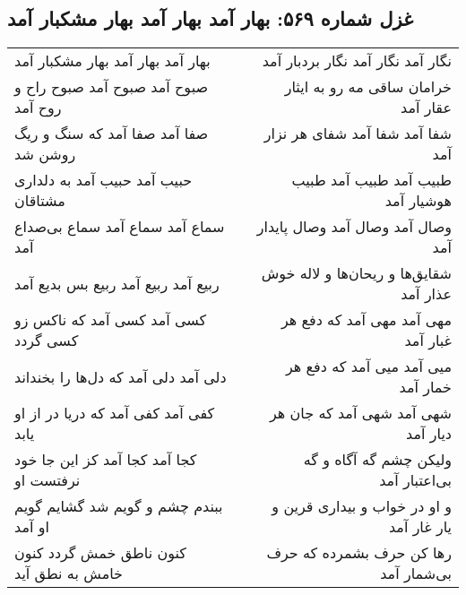 \begin{center}
\section*{غزل شماره ۵۶۹: بهار آمد بهار آمد بهار مشکبار آمد}
\label{sec:0569}
\begin{longtable}{l p{0.5cm} r}
بهار آمد بهار آمد بهار مشکبار آمد
&&
نگار آمد نگار آمد نگار بردبار آمد
\\
صبوح آمد صبوح آمد صبوح راح و روح آمد
&&
خرامان ساقی مه رو به ایثار عقار آمد
\\
صفا آمد صفا آمد که سنگ و ریگ روشن شد
&&
شفا آمد شفا آمد شفای هر نزار آمد
\\
حبیب آمد حبیب آمد به دلداری مشتاقان
&&
طبیب آمد طبیب آمد طبیب هوشیار آمد
\\
سماع آمد سماع آمد سماع بی‌صداع آمد
&&
وصال آمد وصال آمد وصال پایدار آمد
\\
ربیع آمد ربیع آمد ربیع بس بدیع آمد
&&
شقایق‌ها و ریحان‌ها و لاله خوش عذار آمد
\\
کسی آمد کسی آمد که ناکس زو کسی گردد
&&
مهی آمد مهی آمد که دفع هر غبار آمد
\\
دلی آمد دلی آمد که دل‌ها را بخنداند
&&
میی آمد میی آمد که دفع هر خمار آمد
\\
کفی آمد کفی آمد که دریا در از او یابد
&&
شهی آمد شهی آمد که جان هر دیار آمد
\\
کجا آمد کجا آمد کز این جا خود نرفتست او
&&
ولیکن چشم گه آگاه و گه بی‌اعتبار آمد
\\
ببندم چشم و گویم شد گشایم گویم او آمد
&&
و او در خواب و بیداری قرین و یار غار آمد
\\
کنون ناطق خمش گردد کنون خامش به نطق آید
&&
رها کن حرف بشمرده که حرف بی‌شمار آمد
\\
\end{longtable}
\end{center}
